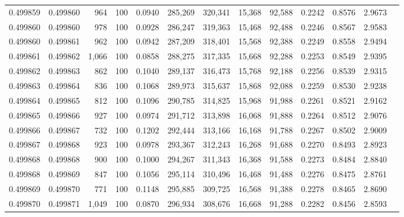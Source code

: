 \begin{tabular}{rrrrrrrrrrrrr}
0.499859 & 0.499860 &   964 & 100 &                                     0.0940 & 285,269 & 320,341 &  15,368 &  92,588 & 0.2242 & 0.8576 & 2.9673 \\
0.499860 & 0.499860 &   978 & 100 &                                     0.0928 & 286,247 & 319,363 &  15,468 &  92,488 & 0.2246 & 0.8567 & 2.9583 \\
0.499860 & 0.499861 &   962 & 100 &                                     0.0942 & 287,209 & 318,401 &  15,568 &  92,388 & 0.2249 & 0.8558 & 2.9494 \\
0.499861 & 0.499862 & 1,066 & 100 &                                     0.0858 & 288,275 & 317,335 &  15,668 &  92,288 & 0.2253 & 0.8549 & 2.9395 \\
0.499862 & 0.499863 &   862 & 100 &                                     0.1040 & 289,137 & 316,473 &  15,768 &  92,188 & 0.2256 & 0.8539 & 2.9315 \\
0.499863 & 0.499864 &   836 & 100 &                                     0.1068 & 289,973 & 315,637 &  15,868 &  92,088 & 0.2259 & 0.8530 & 2.9238 \\
0.499864 & 0.499865 &   812 & 100 &                                     0.1096 & 290,785 & 314,825 &  15,968 &  91,988 & 0.2261 & 0.8521 & 2.9162 \\
0.499865 & 0.499866 &   927 & 100 &                                     0.0974 & 291,712 & 313,898 &  16,068 &  91,888 & 0.2264 & 0.8512 & 2.9076 \\
0.499866 & 0.499867 &   732 & 100 &                                     0.1202 & 292,444 & 313,166 &  16,168 &  91,788 & 0.2267 & 0.8502 & 2.9009 \\
0.499867 & 0.499868 &   923 & 100 &                                     0.0978 & 293,367 & 312,243 &  16,268 &  91,688 & 0.2270 & 0.8493 & 2.8923 \\
0.499868 & 0.499868 &   900 & 100 &                                     0.1000 & 294,267 & 311,343 &  16,368 &  91,588 & 0.2273 & 0.8484 & 2.8840 \\
0.499868 & 0.499869 &   847 & 100 &                                     0.1056 & 295,114 & 310,496 &  16,468 &  91,488 & 0.2276 & 0.8475 & 2.8761 \\
0.499869 & 0.499870 &   771 & 100 &                                     0.1148 & 295,885 & 309,725 &  16,568 &  91,388 & 0.2278 & 0.8465 & 2.8690 \\
0.499870 & 0.499871 & 1,049 & 100 &                                     0.0870 & 296,934 & 308,676 &  16,668 &  91,288 & 0.2282 & 0.8456 & 2.8593 \\

\end{tabular}
